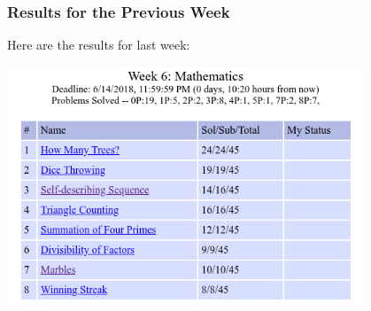 \begin{frame}
  \frametitle{Results for the Previous Week}

  \begin{center}
    Here are the results for last week:

    \bigskip
    
    \includegraphics[width=0.8\textwidth]{img/resultW6}

  \end{center}
\end{frame}

